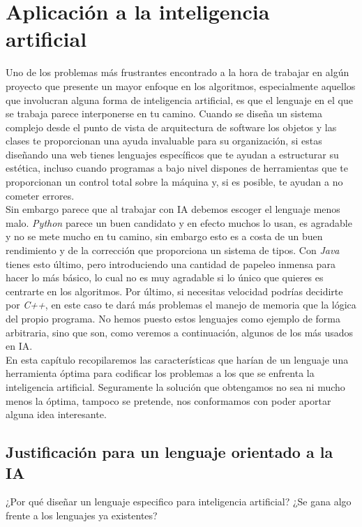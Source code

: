 \chapter{Aplicación a la inteligencia artificial}
\label{sect:ap_ia}

Uno de los problemas más frustrantes encontrado a la hora de trabajar en algún proyecto que presente un mayor enfoque en los algoritmos, especialmente aquellos que involucran alguna forma de inteligencia artificial, es que el lenguaje en el que se trabaja parece interponerse en tu camino.
Cuando se diseña un sistema complejo desde el punto de vista de arquitectura de software los objetos y las clases te proporcionan una ayuda invaluable para su organización, si estas diseñando una web tienes lenguajes específicos que te ayudan a estructurar su estética, incluso cuando programas a bajo nivel dispones de herramientas que te proporcionan un control total sobre la máquina y, si es posible, te ayudan a no cometer errores.\\

Sin embargo parece que al trabajar con \acs{IA} debemos escoger el lenguaje menos malo. \textit{Python} parece un buen candidato y en efecto muchos lo usan, es agradable y no se mete mucho en tu camino, sin embargo esto es a costa de un buen rendimiento y de la corrección que proporciona un sistema de tipos. Con \textit{Java} tienes esto último, pero introduciendo una cantidad de papeleo inmensa para hacer lo más básico, lo cual no es muy agradable si lo único que quieres es centrarte en los algoritmos. Por último, si necesitas velocidad podrías decidirte por \textit{C++}, en este caso te dará más problemas el manejo de memoria que la lógica del propio programa.
No hemos puesto estos lenguajes como ejemplo de forma arbitraria, sino que son, como veremos a continuación, algunos de los más usados en IA.\\


En esta capítulo recopilaremos las características que harían de un lenguaje una herramienta óptima para codificar los problemas a los que se enfrenta la inteligencia artificial. Seguramente la solución que obtengamos no sea ni mucho menos la óptima, tampoco se pretende, nos conformamos con poder aportar alguna idea interesante.\\


\section{Justificación para un lenguaje orientado a la IA}
¿Por qué diseñar un lenguaje especifico para inteligencia artificial? ¿Se gana algo frente a los lenguajes ya existentes?

